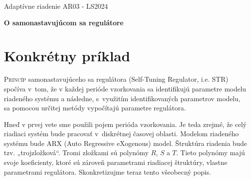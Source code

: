 \documentclass[a4paper, 10pt, ]{article}
\def\oznacenieCasti{AR03 - LS2024}
\begin{document}
\lstset{%
style=mystyle,
rangebeginprefix=\#\#\#\ cellB\ ,%
rangebeginsuffix=\ \#\#\#,%
rangeendprefix=\#\#\#\ cellE\ ,%
rangeendsuffix=\ \#\#\#,%
includerangemarker=false,
}






\fontsize{12pt}{22pt}\selectfont

\centerline{\textsf{Adaptívne riadenie} \hfill \textsf{\oznacenieCasti}}

\fontsize{18pt}{22pt}\selectfont





\begin{flushleft}
	\textbf{\textsf{O samonastavujúcom sa regulátore}}
\end{flushleft}





\normalsize

\bigskip

{\hypersetup{hidelinks}

\tableofcontents

}

\bigskip

\vspace{18pt}












\section{Konkrétny príklad}
\label{konkretPriklad}


\lettrine[lines=3, nindent=0pt]{P}{rincíp} samonastavujúceho sa regulátora (Self-Tuning Regulator, i.e. STR) spočíva v~tom, že v každej perióde vzorkovania sa identifikujú parametre modelu riadeného systému a následne, s~využitím identifikovaných parametrov modelu, sa pomocou určitej metódy vypočítajú parametre regulátora.

Hneď v prvej vete sme použili pojem perióda vzorkovania. Je teda zrejmé, že celý riadiaci systém bude pracovať v~diskrétnej časovej oblasti. Modelom riadeného systému bude ARX (Auto Regressive eXogenous) model. Štruktúra riadenia bude tzv.  „trojzložková“. Tromi zložkami sú polynómy $R$, $S$ a $T$. Tieto polynómy majú svoje koeficienty, ktoré sú zároveň parametrami riadiacej štruktúry, vlastne parametrami regulátora.
Skonkretizujme teraz tento všeobecný popis.
\end{document}
